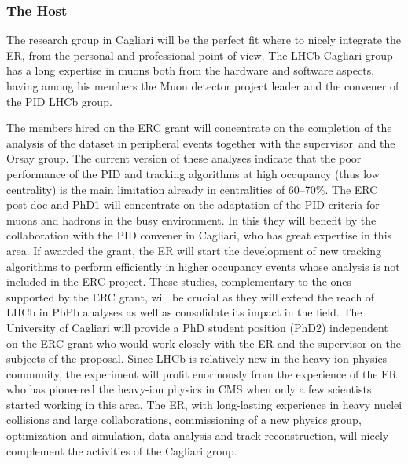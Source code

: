 \documentclass[a4paper,11pt]{article}
\newcommand{\ER}{ER\xspace}
\newcommand{\supervisor}{the supervisor\xspace}
\begin{document}
\subsubsection{The Host}


The research group in Cagliari
will be the perfect fit where to nicely integrate the \ER, from the
personal and professional point of view. 
The LHCb Cagliari group has a long expertise in 
muons both from the hardware and software 
aspects, having among his members the Muon 
detector project leader and the convener of the 
PID LHCb group.

The members hired on the 
ERC grant will 
concentrate on the completion of the \JPsi analysis of the 
\PbPb dataset in peripheral events together with \supervisor\ and the 
Orsay group. The current 
version of these analyses indicate that the 
poor performance of the PID and tracking algorithms at high occupancy 
(thus low centrality) is the main limitation already 
in centralities of 60--70\%. The ERC post-doc and PhD1 will 
concentrate on the adaptation of the PID criteria
for muons and hadrons in the busy \PbPb environment.
In this they will benefit by the collaboration 
with the PID convener in 
Cagliari, who has great expertise in this area.
If awarded the grant, the \ER will start the development of 
new tracking algorithms to perform efficiently in higher 
occupancy events whose analysis is not included in the ERC project.
These studies, complementary to the ones supported by the 
ERC grant, will be crucial as they will extend the 
reach of LHCb in PbPb analyses as well as consolidate 
its impact in the field.
The University of Cagliari will provide a PhD student position (PhD2) 
independent on the ERC grant who would work closely with the 
\ER and \supervisor on the subjects of the proposal.
Since LHCb is relatively new in the 
heavy ion physics community, the experiment
will profit enormously from the experience 
of the \ER who has pioneered the heavy-ion physics 
in CMS when only a few scientists started working 
in this area. 
%
The \ER, with long-lasting experience in heavy nuclei
collisions and large collaborations, commissioning
of a new physics group, optimization and simulation, data analysis and track
reconstruction, will nicely complement the activities
of the Cagliari group.
\end{document}
